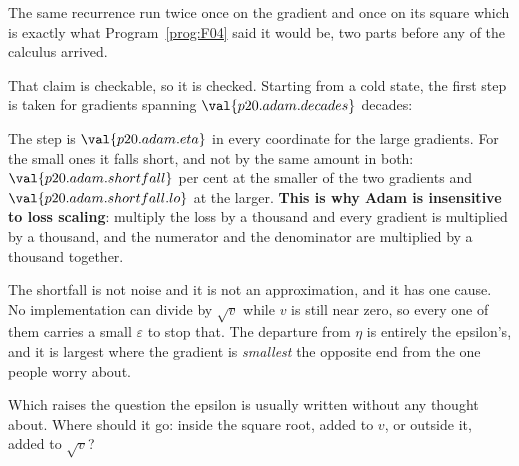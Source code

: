 \begin{fr}
The same recurrence run twice \dash{} once on the gradient and once on its
square \dash{} which is exactly what Program~\ref{prog:F04} said it would be,
two parts before any of the calculus arrived.

That claim is checkable, so it is checked. Starting from a cold state, the
first step is taken for gradients spanning $\val{p20.adam.decades}$ decades:


The step is $\val{p20.adam.eta}$ in every coordinate for the large gradients.
For the small ones it falls short, and not by the same amount in both:
$\val{p20.adam.shortfall}$ per cent at the smaller of the two gradients and
$\val{p20.adam.shortfall.lo}$ at the larger.
\textbf{This is why Adam is insensitive to loss scaling}: multiply the loss by
a thousand and every gradient is multiplied by a thousand, and the numerator
and the denominator are multiplied by a thousand together.
\end{fr}

\begin{fr}
The shortfall is not noise and it is not an approximation, and it has one
cause. No implementation can divide by $\sqrt{v}$ while $v$ is still near
zero, so every one of them carries a small $\varepsilon$ to stop that. The
departure from $\eta$ is entirely the epsilon's, and it is largest where the
gradient is \emph{smallest} \dash{} the opposite end from the one people
worry about.

Which raises the question the epsilon is usually written without any thought
about. Where should it go: inside the square root, added to $v$, or outside
it, added to $\sqrt{v}$?
\dotline
\nextframe
\end{fr}

